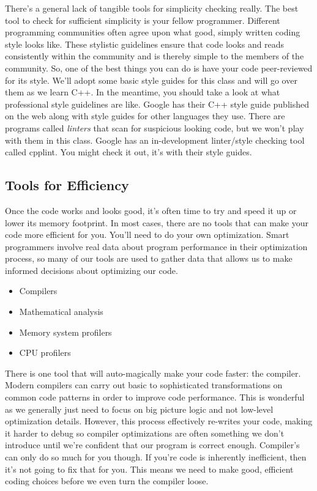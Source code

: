 \documentclass[nobib]{tufte-handout}
\begin{document}
There's a general lack of tangible tools for simplicity checking really. The best tool to check for sufficient simplicity is your fellow programmer.  Different programming communities often agree upon what good, simply written coding style looks like.  These stylistic guidelines ensure that code looks and reads consistently within the community and is thereby simple to the members of the community. So, one of the best things you can do is have your code peer-reviewed for its style. We'll adopt some basic style guides for this class and will go over them as we learn C++. In the meantime, you should take a look at what professional style guidelines are like. Google has their C++ style guide published on the web along with style guides for other languages they use. There are programs called \textit{linters} that scan for suspicious looking code, but we won't play with them in this class. Google has an in-development linter/style checking tool called cpplint.  You might check it out, it's with their style guides.


\subsection{Tools for Efficiency}

Once the code works and looks good, it's often time to try and speed it up or lower its memory footprint. In most cases, there are no tools that can make your code more efficient for you. You'll need to do your own optimization. Smart programmers involve real data about program performance in their optimization process, so many of our tools are used to gather data that allows us to make informed decisions about optimizing our code.
\begin{itemize}
\item Compilers
\item Mathematical analysis
\item Memory system profilers
\item CPU profilers
\end{itemize}

There is one tool that will auto-magically make your code faster: the compiler.  Modern compilers can carry out basic to sophisticated transformations on common code patterns in order to improve code performance.  This is wonderful as we generally just need to focus on big picture logic and not low-level optimization details. However, this process effectively re-writes your code, making it harder to debug so compiler optimizations are often something we don't introduce until we're confident that our program is correct enough.  Compiler's can only do so much for you though. If you're code is inherently inefficient, then it's not going to fix that for you.  This means we need to make good, efficient coding choices before we even turn the compiler loose.
\end{document}
